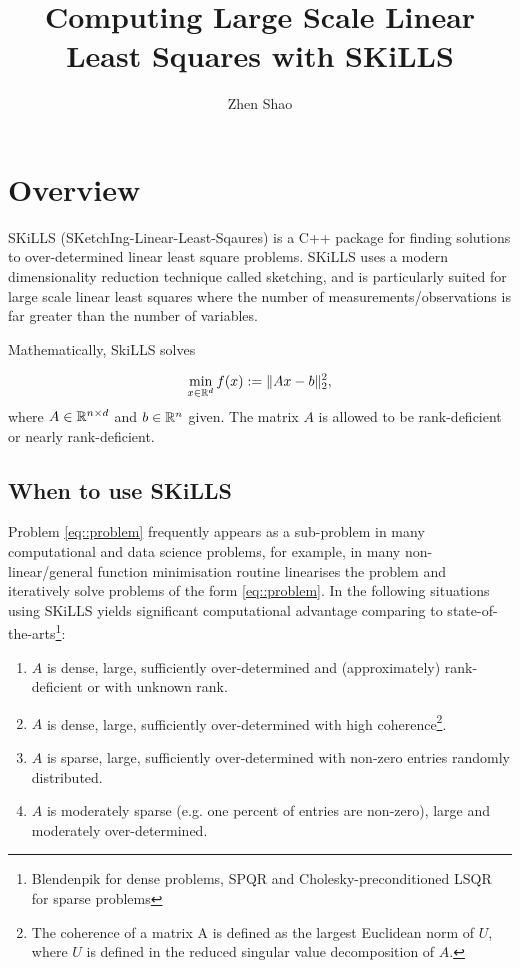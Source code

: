 \documentclass[english,11pt]{article}
\begin{document}
\title{Computing Large Scale Linear Least Squares with SKiLLS}

\author{Zhen Shao}\maketitle

\section{Overview}

SKiLLS (SKetchIng-Linear-Least-Sqaures) is a C++ package for finding solutions to over-determined linear least square problems. SKiLLS uses a modern dimensionality reduction technique called sketching, and is particularly suited for large scale linear least squares where the number of measurements/observations is far greater than the number of variables. 

Mathematically, SkiLLS solves

\begin{align}
\min_{x \in \mathbb{R}^{d}} f(x): = \|Ax - b\|_2^2, \label{eq::problem}
\end{align}
where $A \in \mathbb{R}^{n\times d}$ and $b \in \mathbb{R}^{n}$ given. The matrix $A$ is allowed to be rank-deficient or nearly rank-deficient. 

\subsection{When to use SKiLLS}

Problem \eqref{eq::problem} frequently appears as a sub-problem in many computational and data science problems, for example, in many non-linear/general function minimisation routine linearises the problem and iteratively solve problems of the form \eqref{eq::problem}. In the following situations using SKiLLS yields significant computational advantage comparing to state-of-the-arts\footnote{Blendenpik \cite{doi:10.1137/090767911} for dense problems, SPQR \cite{Davis:2011ft} and Cholesky-preconditioned LSQR \cite{Scott:2014iq} for sparse problems}:

\begin{enumerate}\setlength{\itemsep}{-2pt}
	\item $A$ is dense, large, sufficiently over-determined and (approximately) rank-deficient or with unknown rank.

	\item $A$ is dense, large, sufficiently over-determined with high coherence\footnote{The coherence of a matrix A is defined as the largest Euclidean norm of $U$, where $U$ is defined in the reduced singular value decomposition of $A$. }.

	\item $A$ is sparse, large, sufficiently over-determined with non-zero entries randomly distributed. 

	\item $A$ is moderately sparse (e.g. one percent of entries are non-zero), large and moderately over-determined. 

\end{enumerate}
\end{document}
